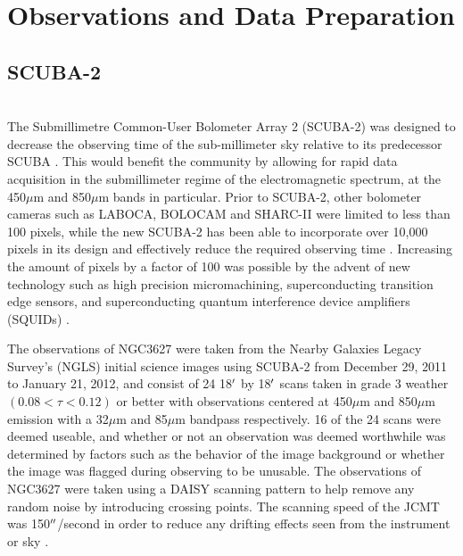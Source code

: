 \chapter{Observations and Data Preparation}\label{observations}

\section{SCUBA-2} \\
The Submillimetre Common-User Bolometer Array 2 (SCUBA-2) was designed to decrease the observing time of the sub-millimeter sky relative to its predecessor SCUBA \citep{holland2013}.  This would benefit the community by allowing for rapid data acquisition in the submillimeter regime of the electromagnetic spectrum, at the 450$\mu$m and 850$\mu$m bands in particular.  Prior to SCUBA-2, other bolometer cameras such as LABOCA, BOLOCAM and SHARC-II were limited to less than 100 pixels, while the new SCUBA-2 has been able to incorporate over 10,000 pixels in its design and effectively reduce the required observing time \citep{chapin2013}.  Increasing the amount of pixels by a factor of 100 was possible by the advent of new technology such as high precision micromachining, superconducting transition edge sensors, and superconducting quantum interference device amplifiers (SQUIDs) \citep{holland2013}.

The observations of NGC3627 were taken from the Nearby Galaxies Legacy Survey's (NGLS) initial science images using SCUBA-2 from December 29, 2011  to January 21, 2012, and consist of 24 18$\mbox{$^\prime$}$ by 18$\mbox{$^\prime$}$ scans taken in grade 3 weather $(0.08 < \tau <0.12)$ or better with observations centered at 450$\mu$m and 850$\mu$m emission with a 32$\mu$m and 85$\mu$m bandpass respectively.  16 of the 24 scans were deemed useable, and whether or not an observation was deemed worthwhile was determined by factors such as the behavior of the image background or whether the image was flagged during observing to be unusable.  The observations of NGC3627 were taken using a DAISY scanning pattern  to help remove any random noise by introducing crossing points.  The scanning speed of the JCMT was 150$\mbox{$^{\prime\prime}$}$/second in order to reduce any drifting effects seen from the instrument or sky \citep{chapin2013}.

